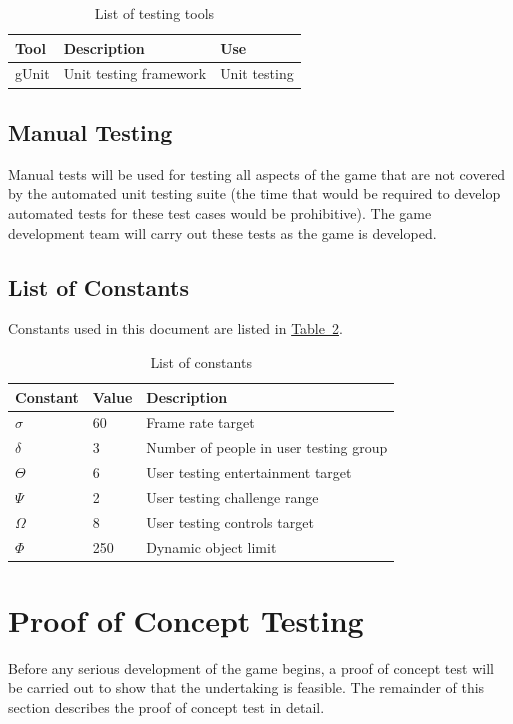 \documentclass[12pt, titlepage]{article}
\begin{document}
\begin{table}[ht]
\caption{List of testing tools} \label{tab:tools}
\begin{tabularx}{\textwidth}{p{2.3cm}p{4.5cm}X}
\toprule {\bf Tool} & {\bf Description} & {\bf Use}\\
\midrule
gUnit & Unit testing framework & Unit testing\\
\bottomrule
\end{tabularx}
\end{table}

\subsection{Manual Testing}
Manual tests will be used for testing all aspects of the game that are not covered by the automated unit testing suite (the time that would be required to develop automated tests for these test cases would be prohibitive).  The game development team will carry out these tests as the game is developed.


\subsection{List of Constants}
Constants used in this document are listed in \hyperref[tab:constants]{Table~\ref*{tab:constants}}.
\begin{table}[ht]
\caption{List of constants} \label{tab:constants}
\begin{tabularx}{\textwidth}{p{3cm}p{2cm}X}
\toprule {\bf Constant} & {\bf Value} & {\bf Description}\\
\midrule
$\sigma$ & 60 & Frame rate target\\
$\delta$ & 3 & Number of people in user testing group\\
$\Theta$ & 6 & User testing entertainment target\\
$\Psi$ & 2 & User testing challenge range\\
$\Omega$ & 8 & User testing controls target\\
$\Phi$ & 250 & Dynamic object limit\\
\bottomrule
\end{tabularx}
\end{table}

\newpage
\section{Proof of Concept Testing}
\label{sec:poc}
Before any serious development of the game begins, a proof of concept test will be carried out to show that the undertaking is feasible.  The remainder of this section describes the proof of concept test in detail.
\end{document}
